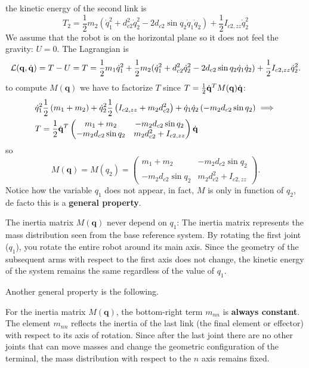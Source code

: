 \documentclass[10pt, a4paper]{report}
\newcommand{\q}{{\mathbf q}}
\begin{document}
the kinetic energy of the second link is\begin{equation}
    T_2=\frac{1}{2}m_2(\dot q_1^2+d_{c2}^2\dot q_2^2-2d_{c2}\sin q_2\dot q_1\dot q_2)+\frac{1}{2}I_{c2,zz}\dot q_2^2
\end{equation}
We assume that the robot is on the horizontal plane so it does not feel the gravity: $U=0$. The Lagrangian is\begin{equation}
    \mathcal L(\q,\dq)=T-U=T=\frac{1}{2}m_1\dot q_1^2+\frac{1}{2}m_2(\dot q_1^2+d_{c2}^2\dot q_2^2-2d_{c2}\sin q_2\dot q_1\dot q_2)+\frac{1}{2}I_{c2,zz}\dot q_2^2.
\end{equation}
to compute $M(\q)$ we have to factorize $T$ since $T=\frac{1}{2}\dq^TM(\q)\dq$:\begin{align}
    &\dot q_1^2\frac{1}{2}\left(
        m_1+m_2
    \right)+\dot q_2^2\frac{1}{2}\left(
        I_{c2,zz}+ m_2d_{c2}^2
    \right)+\dot q_1\dot q_2\left(-m_2d_{c2}\sin q_2\right)
    \implies\\ &T=\frac{1}{2}{\dot{\mathbf q}}^T\begin{pmatrix}
        m_1+m_2 & -m_2d_{c2}\sin q_2\\ 
       -m_2d_{c2}\sin q_2& m_2d_{c2}^2+I_{c2,zz}
    \end{pmatrix}{\dot{\mathbf q}}
\end{align}
so\begin{equation}
    M(\q)=M(q_2)=\begin{pmatrix}
        m_1+m_2 & -m_2d_{c2}\sin q_2\\ 
       -m_2d_{c2}\sin q_2& m_2d_{c2}^2+I_{c2,zz}
    \end{pmatrix}.
\end{equation}
Notice how the variable $q_1$ does not appear, in fact, $M$ is only in function of $q_2$, de facto this is a \textbf{general property}. \begin{boxlemma}{}{}
The inertia matrix $M(\q)$ never depend on $q_1$: The inertia matrix represents the mass distribution seen from the base reference system. By rotating the first joint ($q_1$), you rotate the entire robot around its main axis. Since the geometry of the subsequent arms with respect to the first axis does not change, the kinetic energy of the system remains the same regardless of the value of $q_1$.
\end{boxlemma}
\noindent  Another general property is the following.\begin{boxlemma}{}{}
    For the inertia matrix $M(\q)$, the bottom-right term $m_{nn}$ is \textbf{always constant}. The element $m_{nn}$ reflects the inertia of the last link (the final element or effector) with respect to its axis of rotation. Since after the last joint there are no other joints that can move masses and change the geometric configuration of the terminal, the mass distribution with respect to the $n$ axis remains fixed.
\end{boxlemma}
\end{document}
